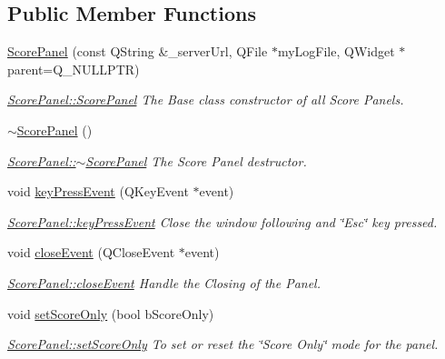 \subsection*{Public Member Functions}
\begin{DoxyCompactItemize}
\item 
\mbox{\hyperlink{classScorePanel_aa3b9debfef09f1bce6510d4318f7841e}{Score\+Panel}} (const Q\+String \&\+\_\+server\+Url, Q\+File $\ast$my\+Log\+File, Q\+Widget $\ast$parent=Q\+\_\+\+N\+U\+L\+L\+P\+TR)
\begin{DoxyCompactList}\small\item\em \mbox{\hyperlink{classScorePanel_aa3b9debfef09f1bce6510d4318f7841e}{Score\+Panel\+::\+Score\+Panel}} The Base class constructor of all Score Panels. \end{DoxyCompactList}\item 
\mbox{\label{classScorePanel_a2ac93bbd627f59e5eeb3054b7c214481}} 
\mbox{\hyperlink{classScorePanel_a2ac93bbd627f59e5eeb3054b7c214481}{$\sim$\+Score\+Panel}} ()
\begin{DoxyCompactList}\small\item\em \mbox{\hyperlink{classScorePanel_a2ac93bbd627f59e5eeb3054b7c214481}{Score\+Panel\+::$\sim$\+Score\+Panel}} The Score Panel destructor. \end{DoxyCompactList}\item 
void \mbox{\hyperlink{classScorePanel_a21276568d4ca7a413087b59d7b5a39cc}{key\+Press\+Event}} (Q\+Key\+Event $\ast$event)
\begin{DoxyCompactList}\small\item\em \mbox{\hyperlink{classScorePanel_a21276568d4ca7a413087b59d7b5a39cc}{Score\+Panel\+::key\+Press\+Event}} Close the window following and \char`\"{}\+Esc\char`\"{} key pressed. \end{DoxyCompactList}\item 
void \mbox{\hyperlink{classScorePanel_ad15e107ab1af80c9670820cc3af91e6d}{close\+Event}} (Q\+Close\+Event $\ast$event)
\begin{DoxyCompactList}\small\item\em \mbox{\hyperlink{classScorePanel_ad15e107ab1af80c9670820cc3af91e6d}{Score\+Panel\+::close\+Event}} Handle the Closing of the Panel. \end{DoxyCompactList}\item 
void \mbox{\hyperlink{classScorePanel_a0573b55e1bd67e61ac88361262440923}{set\+Score\+Only}} (bool b\+Score\+Only)
\begin{DoxyCompactList}\small\item\em \mbox{\hyperlink{classScorePanel_a0573b55e1bd67e61ac88361262440923}{Score\+Panel\+::set\+Score\+Only}} To set or reset the \char`\"{}\+Score Only\char`\"{} mode for the panel. \end{DoxyCompactList}\item 

\end{DoxyCompactItemize}
